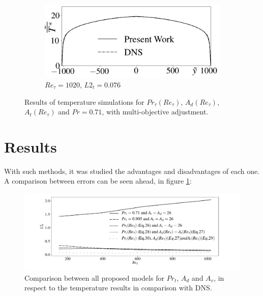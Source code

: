 \documentclass[10pt]{article} %
\begin{document}
\begin{figure}[!h]
\begin{subfigure}[t]{0.5\textwidth}
	\end{subfigure}
	\begin{subfigure}[t]{0.45\textwidth}
		\centering
		\includegraphics[angle=0, scale=0.24]{fotos_formatacao_final/Temperature_1000_071_Genetic2temperature}
		\caption{$Re_\tau = 1020$, $L2_t = 0.076$}
	\end{subfigure}	
	\caption{Results of temperature simulations for $Pr_\tau(Re_\tau)$, $A_d(Re_\tau)$, $A_t(Re_\tau) $ and $Pr =0.71$, with multi-objective adjustment.}
	\vspace{-5mm}
\end{figure}





 
\section{Results}

With such methods, it was studied the advantages and disadvantages of each one. A comparison between errors can be seen ahead, in figure \ref{figure15}:\\

\begin{figure}[!h]
	\centering
	\includegraphics[angle=0, trim = {20mm 0mm 0mm 10mm}, scale=0.5]{fotos_formatacao_final/gerais}
	\caption{Comparison between all proposed models for $Pr_t$, $A_d$ and $A_v$, in respect to the temperature results in comparison with DNS.}
	\label{figure15}
\end{figure}
\end{document}
